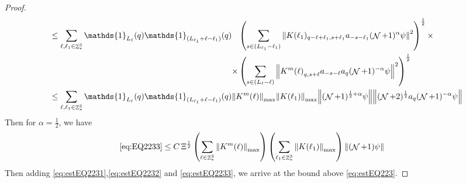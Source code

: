 \documentclass[sn-mathphys, Numbered ,a4paper]{sn-jnl}%
\DeclareMathOperator{\Z}{\mathbb{Z}}
\DeclareMathOperator{\NN}{\mathcal{N}}
\newcommand{\half}{\frac{1}{2}}
\theoremstyle{plain}
\theoremstyle{definition}
\theoremstyle{remark}
\theoremstyle{plain}
\theoremstyle{definition}
\theoremstyle{remark}
\begin{document}
\begin{proof}
\begin{align}
		&\leq \sum\limits_{\ell, \ell_1\in \Z^3_*} \mathds{1}_{L_{\ell}}(q) \mathds{1}_{(L_{\ell_1}+\ell-\ell_1)}(q) \begin{aligned}[t]&\left(\sum\limits_{ s \in  (L_{\ell_1}-\ell_1)} \norm{K(\ell_1)_{q-\ell+\ell_1,s+\ell_1} a_{-s-\ell_1} (\NN+1)^{\alpha}\psi}^2\right)^\half \times \nonumber\\ \times &\left( \sum\limits_{ s \in (L_{\ell}-\ell) } \norm{ K^m{(\ell)}_{q,s+\ell}  a_{-s-\ell} a_{q} (\NN+1)^{-\alpha} \psi }^2\right)^\half \end{aligned}\nonumber\\
		&\leq \sum\limits_{\ell, \ell_1\in \Z^3_*} \mathds{1}_{L_{\ell}}(q) \mathds{1}_{(L_{\ell_1}+\ell-\ell_1)}(q) \norm{K^m{(\ell)}}_{\mathrm{max}} \norm{K(\ell_1)}_{\mathrm{max}} \norm{ (\NN+1)^{\half+\alpha}\psi} \norm{  (\NN+2)^\half  a_{q} (\NN+1)^{-\alpha} \psi } \nonumber
	\end{align} 
	Then for $\alpha = \half$, we have
	\begin{align}
		\eqref{eq:EQ2233}&\leq C\, \Xi^\half \left(\sum\limits_{\ell\in \Z^3_*} \norm{K^m(\ell)}_{\mathrm{max}}\right)\left(  \sum\limits_{ \ell_1\in \Z^3_*}  \norm{ K(\ell_1)}_{\mathrm{max}} \right) \norm{ (\NN+1) \psi}\label{eq:estEQ2233} 
	\end{align}
	Then adding \eqref{eq:estEQ2231},\eqref{eq:estEQ2232} and \eqref{eq:estEQ2233}, we arrive at the bound above \eqref{eq:estEQ223}. 
\end{proof}
\end{document}
